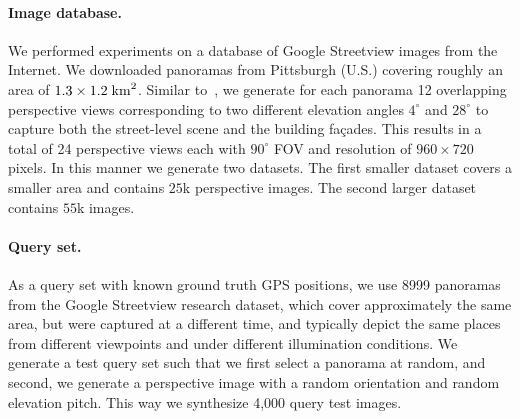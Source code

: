     \paragraph{Image database.}
      We performed experiments on a database of Google Streetview images from the Internet. We downloaded panoramas from Pittsburgh (U.S.) covering roughly an area of $1.3 \times 1.2 \; {\rm km}^2$. Similar to~\cite{Chen11}, we generate for each panorama 12 overlapping perspective views corresponding to two different elevation angles $4^\circ$ and $28^\circ$ to capture both the street-level scene and the building fa\c{c}ades. This results in a total of 24 perspective views each with $90^\circ$ FOV and resolution of $960 \times 720$ pixels. In this manner we generate two datasets. The first smaller dataset covers a smaller area and contains $25$k perspective images.  The second larger dataset contains $55$k images.

      \paragraph{Query set.}
      As a query set with known ground truth GPS positions, we use 8999 panoramas from the Google Streetview research dataset, which cover approximately the same area, but were captured at a different time, and typically depict the same places from different viewpoints and under different illumination conditions.          
      We generate a test query set such that we first select a panorama at random, and second, we generate a perspective image with a random orientation and random elevation pitch. This way we synthesize 4,000 query test images. 

